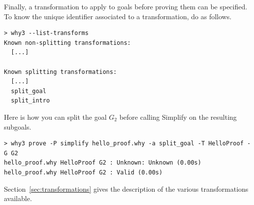 Finally, a transformation to apply to goals before proving them can be
specified. To know the unique identifier associated to
a transformation, do as follows.
\begin{verbatim}
> why3 --list-transforms
Known non-splitting transformations:
  [...]

Known splitting transformations:
  [...]
  split_goal
  split_intro
\end{verbatim}
Here is how you can split the goal $G_2$ before calling
Simplify on the resulting subgoals.
\begin{verbatim}
> why3 prove -P simplify hello_proof.why -a split_goal -T HelloProof -G G2
hello_proof.why HelloProof G2 : Unknown: Unknown (0.00s)
hello_proof.why HelloProof G2 : Valid (0.00s)
\end{verbatim}
Section~\ref{sec:transformations} gives the description of the various
transformations available.

